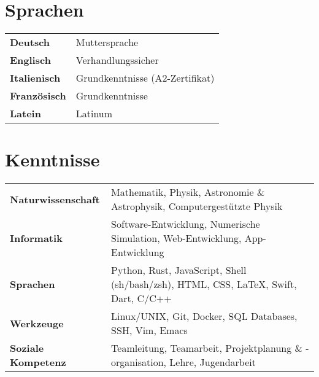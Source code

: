 \documentclass{cv}
\begin{document}
        \section{Sprachen}\vspace*{1mm}
        \begin{tabular}{p{3.5cm} l}
            \textbf{Deutsch}     & Muttersprache                      \vspace*{1mm} \\ 
            \textbf{Englisch}    & Verhandlungssicher                 \vspace*{1mm} \\
            \textbf{Italienisch} & Grundkenntnisse (A2-Zertifikat)    \vspace*{1mm} \\
            \textbf{Französisch} & Grundkenntnisse                    \vspace*{1mm} \\
            \textbf{Latein}      & Latinum
        \end{tabular}\vspace*{-3mm}
        \section{Kenntnisse}\vspace*{1mm}
        \begin{tabular}{p{3.5cm} l}
            \textbf{Naturwissenschaft} & Mathematik, Physik, Astronomie \& Astrophysik, Computergestützte Physik \vspace*{1mm} \\
            \textbf{Informatik} & Software-Entwicklung, Numerische Simulation, Web-Entwicklung, App-Entwicklung \vspace*{1mm} \\
            \textbf{Sprachen} & Python, Rust, JavaScript, Shell (sh/bash/zsh), HTML, CSS, LaTeX, Swift, Dart, C/C++ \vspace*{1mm} \\
            \textbf{Werkzeuge} & Linux/UNIX, Git, Docker, SQL Databases, SSH, Vim, Emacs \vspace*{1mm} \\
            \textbf{Soziale Kompetenz} & Teamleitung, Teamarbeit, Projektplanung \& -organisation, Lehre, Jugendarbeit
        \end{tabular}\vspace*{-3mm}
\end{document}
